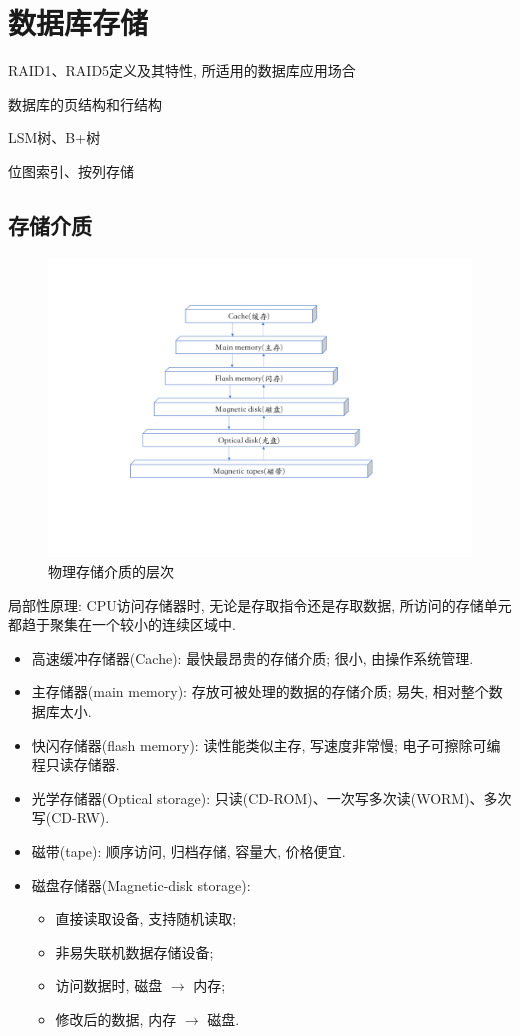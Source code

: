 \chapter{数据库存储}

\begin{introduction}[期末考试提纲]
    \item RAID1、RAID5定义及其特性, 所适用的数据库应用场合
    \item 数据库的页结构和行结构
    \item LSM树、B+树
    \item 位图索引、按列存储
\end{introduction}

\section{存储介质}

\begin{figure}[H]
    \centering
    \includegraphics[width=.65\textwidth]{./figure/存储介质层次.pdf}
    \caption{物理存储介质的层次}
\end{figure}

局部性原理: CPU访问存储器时, 无论是存取指令还是存取数据, 所访问的存储单元都趋于聚集在一个较小的连续区域中.

\begin{itemize}
    \item 高速缓冲存储器(Cache): 最快最昂贵的存储介质; 很小, 由操作系统管理.
    \item 主存储器(main memory): 存放可被处理的数据的存储介质; 易失, 相对整个数据库太小.
    \item 快闪存储器(flash memory): 读性能类似主存, 写速度非常慢; 电子可擦除可编程只读存储器.
    \item 光学存储器(Optical storage): 只读(CD-ROM)、一次写多次读(WORM)、多次写(CD-RW).
    \item 磁带(tape): 顺序访问, 归档存储, 容量大, 价格便宜.
    \item 磁盘存储器(Magnetic-disk storage):
    \begin{itemize}
        \item 直接读取设备, 支持随机读取;
        \item 非易失联机数据存储设备;
        \item 访问数据时, 磁盘 $\to$ 内存;
        \item 修改后的数据, 内存 $\to$ 磁盘.
    \end{itemize}
\end{itemize}

